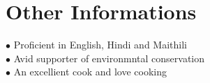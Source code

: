 \documentclass[letterpaper]{twentysecondcv} %
\begin{document}
\begin{twentyshort} %
\end{twentyshort}
\fi


\section{Other Informations}

$\bullet$ Proficient in English, Hindi and Maithili\\
$\bullet$ Avid supporter of environmntal conservation\\
$\bullet$ An excellient cook and love cooking\\





\end{document}
